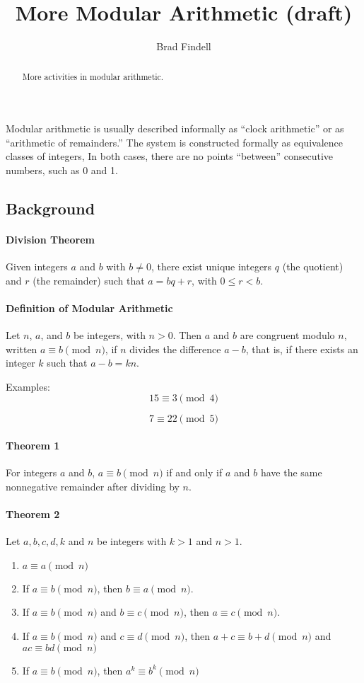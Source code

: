 \documentclass[space,nooutcomes]{ximera}
\title{More Modular Arithmetic (draft)}
\author{Brad Findell}
\begin{document}
\begin{abstract}
More activities in modular arithmetic.  
\end{abstract}
\maketitle


Modular arithmetic is usually described informally as ``clock arithmetic'' or as ``arithmetic of remainders.''  The system is constructed formally as equivalence classes of integers,   In both cases, there are no points ``between'' consecutive numbers, such as 0 and 1.  

\subsection*{Background}
\paragraph{Division Theorem} Given integers $a$ and $b$ with $b\neq 0$, there exist unique integers $q$ (the quotient) and $r$ (the remainder) such that $a = bq + r$, with $0 \leq r < b$.
 
\paragraph{Definition of Modular Arithmetic}  Let $n$, $a$, and $b$ be integers, with $n > 0$.  Then $a$ and $b$ are congruent modulo $n$, written $a\equiv b\pmod{n}$, if $n$ divides the difference $a-b$, that is, if there exists an integer $k$ such that $a-b = kn$.
  
Examples:  
$$15\equiv 3 \pmod{4}$$

$$7\equiv  22 \pmod{5}$$

\paragraph{Theorem 1}
For integers $a$ and $b$, $a\equiv b \pmod{n}$ if and only if $a$ and $b$ have the same nonnegative remainder after dividing by $n$.

\paragraph{Theorem 2}
Let $a, b, c, d, k$ and $n$ be integers with $k>1$ and $n > 1$.
\begin{enumerate}%
\item $a\equiv a \pmod{n}$
\item If $a\equiv b \pmod{n}$, then $b\equiv a \pmod{n}$.  
\item If $a\equiv b \pmod{n}$ and $b\equiv c \pmod{n}$, then $a\equiv c \pmod{n}$.
\item If $a\equiv b \pmod{n}$ and $c\equiv d \pmod{n}$, then $a+c\equiv b+d \pmod{n}$ and $ac\equiv bd \pmod{n}$
\item If $a\equiv b \pmod{n}$, then $a^k\equiv b^k \pmod{n}$
\end{enumerate}
\end{document}
